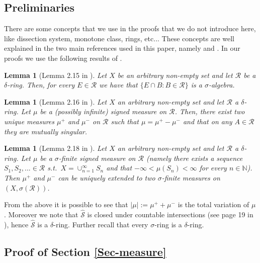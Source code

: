 \documentclass{article}
\theoremstyle{plain}
\newtheorem{lemma}[theorem]{Lemma}
\theoremstyle{remark}
\begin{document}
\subsection*{Preliminaries}
There are some concepts that we use in the proofs that we do not introduce here, like dissection system, monotone class, rings, etc... These concepts are well explained in the two main references used in this paper, namely \cite{Kallenberg2} and \cite{Daley1,Daley}. In our proofs we use the following results of \cite{Pass}.
\begin{lemma}[Lemma 2.15 in \cite{Pass}]\label{215}
	Let $X$ be an arbitrary non-empty set and let $\mathcal{R}$ be a $\delta$-ring. Then, for every $E\in\mathcal{R}$ we have that $\{E\cap B:B\in\mathcal{R}\}$ is a $\sigma$-algebra.
\end{lemma}
\begin{lemma}[Lemma 2.16 in \cite{Pass}]\label{lem-vecchio-2}
	Let $X$ an arbitrary non-empty set and let $\mathcal{R}$ a $\delta$-ring. Let $\mu$ be a (possibly infinite) signed measure on $\mathcal{R}$. Then, there exist two unique measures $\mu^{+}$ and $\mu^{-}$ on $\mathcal{R}$ such that $\mu=\mu^{+}-\mu^{-}$ and that on any $A\in\mathcal{R}$ they are mutually singular.
\end{lemma}
\begin{lemma}[Lemma 2.18 in \cite{Pass}]\label{lem-vecchio-3}
	Let $X$ an arbitrary non-empty set and let $\mathcal{R}$ a $\delta$-ring. Let $\mu$ be a $\sigma$-finite signed measure on $\mathcal{R}$ (namely there exists a sequence $S_{1},S_{2},...\in\mathcal{R}$ s.t.~$X=\cup_{n=1}^{\infty}S_{n}$ and that $-\infty<\mu(S_{n})<\infty$ for every $n\in\mathbb{N}$). Then $\mu^{+}$ and $\mu^{-}$ can be uniquely extended to two $\sigma$-finite measures on $(X,\sigma(\mathcal{R}))$.
\end{lemma}
From the above it is possible to see that $|\mu|:=\mu^{+}+\mu^{-}$ is the total variation of $\mu$. Moreover we note that $\hat{\mathcal{S}}$ is closed under countable intersections (see page 19 in \cite{Kallenberg2}), hence $\hat{\mathcal{S}}$ is a $\delta$-ring. Further recall that every $\sigma$-ring is a $\delta$-ring.




\subsection*{Proof of Section \ref{Sec-measure}}
\end{document}
